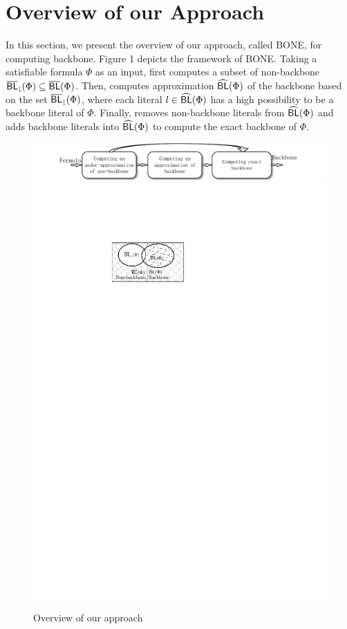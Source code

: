 \section{Overview of our Approach}\label{sec:overview}
In this section, we present the overview of our approach, called BONE, for computing backbone. Figure 1 depicts the framework of BONE.
Taking a satisfiable formula $\Phi$ as an input, \tool first computes a subset of non-backbone ${\sf \overline{BL}_\downharpoonright}(\Phi)\subseteq \overline{\textsf{BL}}(\Phi)$.
Then, \tool computes
approximation ${\sf \widehat{BL}}(\Phi)$ of the backbone
based on the set ${\sf \overline{BL}_\downharpoonright}(\Phi)$, where each literal $l\in {\sf \widehat{BL}}(\Phi)$ has a high possibility to be a backbone literal of $\Phi$.
Finally, \tool removes non-backbone literals from ${\sf \widehat{BL}}(\Phi)$ and adds backbone literals into ${\sf \widehat{BL}}(\Phi)$ to compute the exact backbone of $\Phi$.
\begin{figure}[t]
   \includegraphics[scale=0.75]{Framework}
  \hspace*{30mm} \includegraphics[scale=0.75]{Fig-backbone}
   \caption{Overview of our approach}
   \label{flow}
\end{figure}


